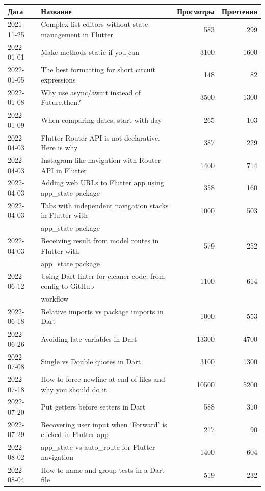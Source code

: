 \begin{longtable}{|l|l|r|r|}
    \hline
    \textbf{Дата} & \textbf{Название} & \textbf{Просмотры} & \textbf{Прочтения}\\
    \hline
    2021-11-25 & Complex list editors without state management in Flutter & 583 & 299\\
    2022-01-01 & Make methods static if you can & 3100 & 1600\\
    2022-01-05 & The best formatting for short circuit expressions & 148 & 82\\
    2022-01-08 & Why use async/await instead of Future.then? & 3500 & 1300\\
    2022-01-09 & When comparing dates, start with day & 265 & 103\\
    2022-04-03 & Flutter Router API is not declarative. Here is why & 387 & 229\\
    2022-04-03 & Instagram-like navigation with Router API in Flutter & 1400 & 714\\
    2022-04-03 & Adding web URLs to Flutter app using app\_state package & 358 & 160\\
    2022-04-03 & Tabs with independent navigation stacks in Flutter with & 1000 & 503\\
    & app\_state package & & \\
    2022-04-03 & Receiving result from model routes in Flutter with & 579 & 252\\
    & app\_state package & & \\
    2022-06-12 & Using Dart linter for cleaner code: from config to GitHub & 1100 & 614\\
    & workflow & & \\
    2022-06-18 & Relative imports vs package imports in Dart & 1000 & 553\\
    2022-06-26 & Avoiding late variables in Dart & 13300 & 4700\\
    2022-07-08 & Single vs Double quotes in Dart & 3100 & 1300\\
    2022-07-18 & How to force newline at end of files and why you should do it & 10500 & 5200\\
    2022-07-20 & Put getters before setters in Dart & 588 & 310\\
    2022-07-29 & Recovering user input when `Forward' is clicked in Flutter app & 217 & 90\\
    2022-08-02 & app\_state vs auto\_route for Flutter navigation & 1400 & 604\\
    2022-08-04 & How to name and group tests in a Dart file & 519 & 232\\

\end{longtable}
